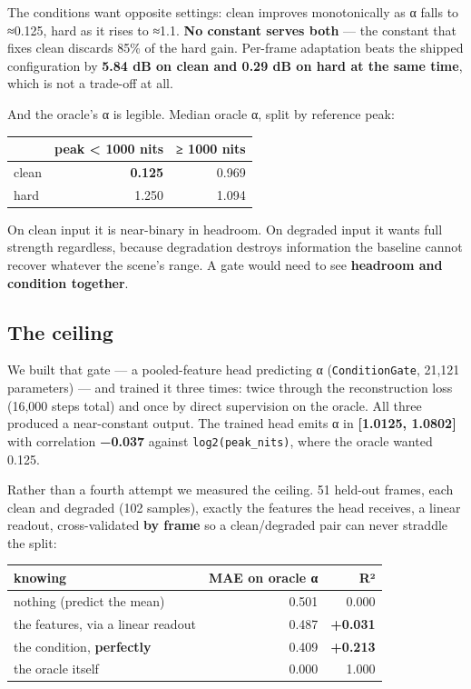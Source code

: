 The conditions want opposite settings: clean improves monotonically as α falls
to ≈0.125, hard as it rises to ≈1.1. \textbf{No constant serves both} --- the constant
that fixes clean discards 85\% of the hard gain. Per-frame adaptation beats the
shipped configuration by \textbf{5.84 dB on clean and 0.29 dB on hard at the same
time}, which is not a trade-off at all.

And the oracle's α is legible. Median oracle α, split by reference peak:

\begin{longtable}[]{@{}lrr@{}}
\toprule
& peak \textless{} 1000 nits & ≥ 1000 nits\tabularnewline
\midrule
\endhead
clean & \textbf{0.125} & 0.969\tabularnewline
hard & 1.250 & 1.094\tabularnewline
\bottomrule
\end{longtable}

On clean input it is near-binary in headroom. On degraded input it wants full
strength regardless, because degradation destroys information the baseline
cannot recover whatever the scene's range. A gate would need to see \textbf{headroom
and condition together}.

\hypertarget{the-ceiling}{%
\subsection{The ceiling}\label{the-ceiling}}

We built that gate --- a pooled-feature head predicting α (\texttt{ConditionGate},
21,121 parameters) --- and trained it three times: twice through the
reconstruction loss (16,000 steps total) and once by direct supervision on the
oracle. All three produced a near-constant output. The trained head emits α in
\textbf{{[}1.0125, 1.0802{]}} with correlation \textbf{−0.037} against \texttt{log2(peak\_nits)},
where the oracle wanted 0.125.

Rather than a fourth attempt we measured the ceiling. 51 held-out frames, each
clean and degraded (102 samples), exactly the features the head receives, a
linear readout, cross-validated \textbf{by frame} so a clean/degraded pair can never
straddle the split:

\begin{longtable}[]{@{}lrr@{}}
\toprule
knowing & MAE on oracle α & R²\tabularnewline
\midrule
\endhead
nothing (predict the mean) & 0.501 & 0.000\tabularnewline
the features, via a linear readout & 0.487 & \textbf{+0.031}\tabularnewline
the condition, \textbf{perfectly} & 0.409 & \textbf{+0.213}\tabularnewline
the oracle itself & 0.000 & 1.000\tabularnewline
\bottomrule
\end{longtable}

